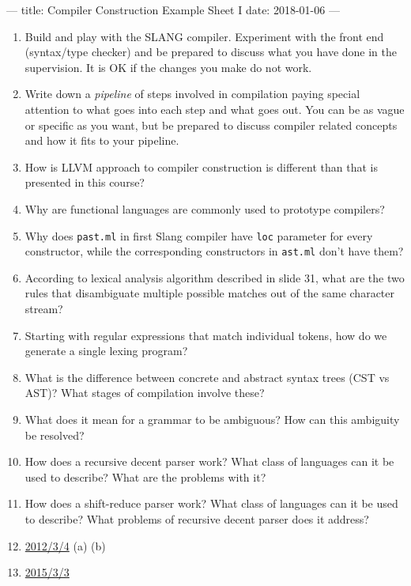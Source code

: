 ---
title: Compiler Construction Example Sheet I
date: 2018-01-06
---



\begin{enumerate}
  \item Build and play with the SLANG compiler. Experiment with the front end
    (syntax/type checker) and be prepared to discuss what you have done in the
    supervision. It is OK if the changes you make do not work.

  \item Write down a \emph{pipeline} of steps involved in compilation paying
    special attention to what goes into each step and what goes out. You can be
    as vague or specific as you want, but be prepared to discuss compiler
    related concepts and how it fits to your pipeline.

  \item How is \textsc{LLVM} approach to compiler construction is different
    than that is presented in this course?

  \item Why are functional languages are commonly used to prototype compilers?

  \item Why does \texttt{past.ml} in first Slang compiler have \texttt{loc}
    parameter for every constructor, while the corresponding constructors in
    \texttt{ast.ml} don't have them?

  \item According to lexical analysis algorithm described in slide 31, what are
    the two rules that disambiguate multiple possible matches out of the same
    character stream?

  \item Starting with regular expressions that match individual tokens, how do
    we generate a single lexing program?

  \item What is the difference between concrete and abstract syntax trees (CST
    vs AST)? What stages of compilation involve these?

  \item What does it mean for a grammar to be ambiguous? How can this ambiguity
    be resolved?

  \item How does a recursive decent parser work? What class of languages can it
    be used to describe? What are the problems with it?

  \item How does a shift-reduce parser work? What class of languages can it be
    used to describe? What problems of recursive decent parser does it address?

  \item \href{http://www.cl.cam.ac.uk/teaching/exams/pastpapers/y2012p3q4.pdf}{2012/3/4} (a) (b)

  \item \href{http://www.cl.cam.ac.uk/teaching/exams/pastpapers/y2015p3q3.pdf}{2015/3/3}
\end{enumerate}


